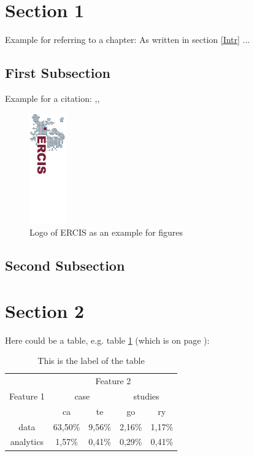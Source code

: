 \documentclass[a4paper, 12pt, titlepage, headsepline, listof = totoc, bibliography = totoc, numbers = noenddot]{scrartcl}
\begin{document}
\newpage
\section{Section 1}
Example for referring to a chapter: As written in section \ref{Intr} ...

  \subsection{First Subsection}
	Example for a citation: \cite{sqltuerker},\cite{journals/jods/VolzSM05}, \cite{das}\\

	\begin{figure}[t!]
	\centering
	  \includegraphics[height=0.49\textwidth,angle=90]{images/ercis.png}
	    \caption{Logo of ERCIS as an example for figures}
	  \label{ERCIS_Logo}
	\end{figure}

  \subsection{Second Subsection}

\newpage
\section{Section 2}
Here could be a table, e.g. table \ref{tab} (which is on page \pageref{tab}):

\begin{table}[ht] 
   \centering
      \begin{tabular}{|c||c|c|c|c|} \hline
			& \multicolumn{4}{c|}{Feature 2} 						\\
	Feature 1 & \multicolumn{2}{c|}{case} & \multicolumn{2}{c|}{studies}	\\
			& ca 			& te 		& go 	& ry 					\\ \hline \hline
	data 		& 63,50\% 	& 9,56\% 	& 2,16\% 	& 1,17\% 				\\ \hline
	analytics 	& 1,57\% 		& 0,41\% 	& 0,29\% 	& 0,41\% 				\\ \hline
      \end{tabular}
      \caption{This is the label of the table}
   \label{tab}
\end{table}
\end{document}
